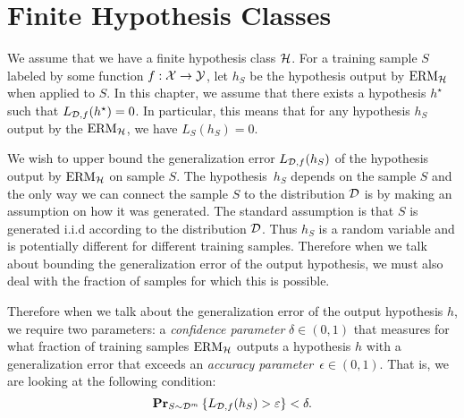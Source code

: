 \section{Finite Hypothesis Classes}

We assume that we have a finite hypothesis class $\mathcal{H}$. For a training
sample $S$ labeled by some function $f: \mathcal{X} \rightarrow \mathcal{Y}$, let $h_S$
be the hypothesis output by $\text{ERM}_{\mathcal{H}}$ when applied to $S$. In this chapter,
we assume that there exists a hypothesis $h^{\star}$ such that
$L_{\mathcal{D}, f}(h^{\star}) = 0$. In particular, this means that for any hypothesis $h_S$
output by the $\text{ERM}_{\mathcal{H}}$, we have $L_S(h_S) = 0$.

We wish to upper bound the generalization error $L_{\mathcal{D}, f}(h_S)$ of the hypothesis
output by $\text{ERM}_{\mathcal{H}}$ on sample $S$. The hypothesis~$h_S$ depends on the sample
$S$ and the only way we can connect the sample $S$ to the distribution $\mathcal{D}$ is by
making an assumption on how it was generated. The standard assumption is that $S$
is generated i.i.d according to the distribution $\mathcal{D}$. Thus $h_S$ is a random
variable and is potentially different for different training samples. Therefore
when we talk about bounding the generalization error of the output hypothesis, we
must also deal with the fraction of samples for which this is possible.

Therefore when we talk about the generalization error of the output hypothesis $h$,
we require two parameters:
a \emph{confidence parameter} $\delta \in (0, 1)$ that measures for what fraction
of training samples $\text{ERM}_{\mathcal{H}}$ outputs a hypothesis $h$ with a
generalization error that exceeds an \emph{accuracy parameter}~$\epsilon \in (0, 1)$.
That is, we are looking at the following condition:
\begin{equation}
    \mathbf{Pr}_{S \sim \mathcal{D}^m} \left \{ L_{\mathcal{D}, f}(h_S) > \varepsilon \right \} < \delta.
\end{equation}


